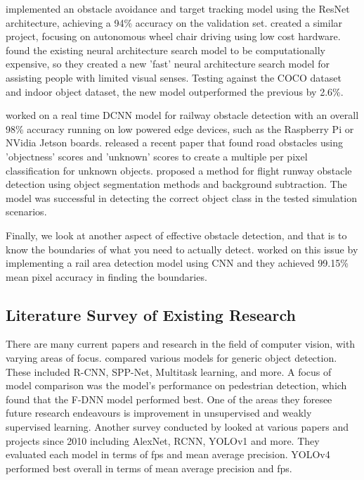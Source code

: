 \documentclass[stu,12pt,floatsintext]{apa7}
\begin{document}
\textcite{fang_computer_2021} implemented an obstacle avoidance and target tracking model using the ResNet architecture, achieving a 94\% accuracy on the validation set. \textcite{farheen_object_2022} created a similar project, focusing on autonomous wheel chair driving using low cost hardware. \textcite{said_obstacle_2023} found the existing neural architecture search model to be computationally expensive, so they created a new 'fast' neural architecture search model for assisting people with limited visual senses. Testing against the COCO dataset and indoor object dataset, the new model outperformed the previous by 2.6\%.

\textcite{jenefa_real-time_2023} worked on a real time DCNN model for railway obstacle detection with an overall 98\% accuracy running on low powered edge devices, such as the Raspberry Pi or NVidia Jetson boards. \textcite{noguchi_road_2024} released a recent paper that found road obstacles using 'objectness' scores and 'unknown' scores to create a multiple per pixel classification for unknown objects. \textcite{andreev_runway_2021} proposed a method for flight runway obstacle detection using object segmentation methods and background subtraction. The model was successful in detecting the correct object class in the tested simulation scenarios. 

Finally, we look at another aspect of effective obstacle detection, and that is to know the boundaries of what you need to actually detect. \textcite{wang_efficient_2018} worked on this issue by implementing a rail area detection model using CNN and they achieved 99.15\% mean pixel accuracy in finding the boundaries.

\subsection{Literature Survey of Existing Research}
There are many current papers and research in the field of computer vision, with varying areas of focus. \textcite{zhao_object_2019} compared various models for generic object detection. These included R-CNN, SPP-Net, Multitask learning, and more. A focus of model comparison was the model's performance on pedestrian detection, which found that the F-DNN model \parencite{du_fused_2017} performed best.
One of the areas they foresee future research endeavours is improvement in unsupervised and weakly supervised learning. Another survey conducted by \textcite{turay_toward_2022} looked at various papers and projects since 2010 including AlexNet, RCNN, YOLOv1 and more. They evaluated each model in terms of fps and mean average precision. YOLOv4 performed best overall in terms of mean average precision and fps.
\end{document}
